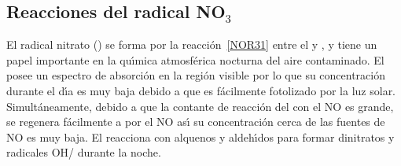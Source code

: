 \subsection{Reacciones del radical NO$_3$}
El radical nitrato () se forma por la reacci\'on~\ref{NOR31} entre el  y ,  y tiene un papel importante en la qu\'{\i}mica atmosf\'erica nocturna del aire contaminado. El  posee un espectro de absorci\'on en la regi\'on visible por lo que su concentraci\'on durante el d\'{\i}a es muy baja debido a que es f\'acilmente fotolizado por la luz solar. Simult\'aneamente, debido a que la contante de reacci\'on del  con el NO es grande, se regenera f\'acilmente a  por el NO as\'{\i} su concentraci\'on cerca de las fuentes de NO es muy baja. El  reacciona con alquenos y aldeh\'{\i}dos para formar dinitratos y radicales OH/ durante la noche. 
